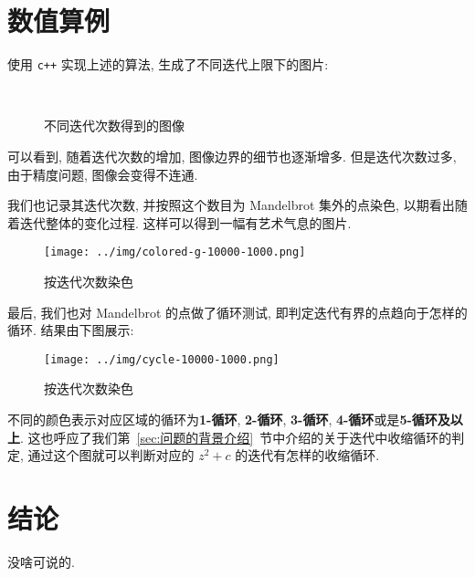 \documentclass{ctexart}
\begin{document}
\section{数值算例} %
\label{sec:数值算例}
使用 \verb|c++| 实现上述的算法, 生成了不同迭代上限下的图片:\par
\begin{figure}[H]
\centering
{}
\quad
{}
\\
\quad
{}
\caption{不同迭代次数得到的图像}
\end{figure} 
可以看到, 随着迭代次数的增加, 图像边界的细节也逐渐增多. 但是迭代次数过多, 由于精度问题, 图像会变得不连通. \par
我们也记录其迭代次数, 并按照这个数目为 Mandelbrot 集外的点染色, 以期看出随着迭代整体的变化过程. 这样可以得到一幅有艺术气息的图片.\par
\begin{figure}[H]
	\centering
	\texttt{[image: ../img/colored-g-10000-1000.png]}
	\caption{按迭代次数染色}
	\label{fig::colored}
\end{figure}
最后, 我们也对 Mandelbrot 的点做了循环测试, 即判定迭代有界的点趋向于怎样的循环. 结果由下图展示:
\begin{figure}[H]
	\centering
	\texttt{[image: ../img/cycle-10000-1000.png]}
	\caption{按迭代次数染色}
	\label{fig::iter}
\end{figure}
不同的颜色表示对应区域的循环为\textbf{\textcolor{color1}{1-循环}}, \textbf{\textcolor{color2}{2-循环}}, \textbf{\textcolor{color3}{3-循环}}, \textbf{\textcolor{color4}{4-循环}}或是\textbf{\textcolor{color5}{5-循环及以上}}. 这也呼应了我们第~\ref{sec:问题的背景介绍}~节中介绍的关于迭代中收缩循环的判定, 通过这个图就可以判断对应的 $z^2 + c$ 的迭代有怎样的收缩循环.
\section{结论} %
\label{sec:结论}
没啥可说的.

\end{document}
